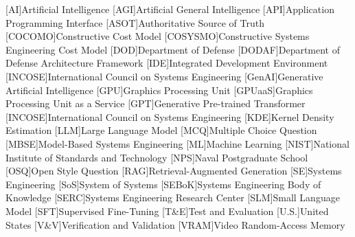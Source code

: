 \begin{acronym} %


[AI]{Artificial Intelligence}
[AGI]{Artificial General Intelligence}
[API]{Application Programming Interface}
[ASOT]{Authoritative Source of Truth}
[COCOMO]{Constructive Cost Model}
[COSYSMO]{Constructive Systems Engineering Cost Model}
[DOD]{Department of Defense}
[DODAF]{Department of Defense Architecture Framework}
[IDE]{Integrated Development Environment}
[INCOSE]{International Council on Systems Engineering}
[GenAI]{Generative Artificial Intelligence}
[GPU]{Graphics Processing Unit}
[GPUaaS]{Graphics Processing Unit as a Service}
[GPT]{Generative Pre-trained Transformer}
[INCOSE]{International Council on Systems Engineering}
[KDE]{Kernel Density Estimation}
[LLM]{Large Language Model}
[MCQ]{Multiple Choice Question}
[MBSE]{Model-Based Systems Engineering}
[ML]{Machine Learning}
[NIST]{National Institute of Standards and Technology}
[NPS]{Naval Postgraduate School}
[OSQ]{Open Style Question}
[RAG]{Retrieval-Augmented Generation}
[SE]{Systems Engineering}
[SoS]{System of Systems}
[SEBoK]{Systems Engineering Body of Knowledge}
[SERC]{Systems Engineering Research Center}
[SLM]{Small Language Model}
[SFT]{Supervised Fine-Tuning}
[T\&E]{Test and Evaluation}
[U.S.]{United States}
[V\&V]{Verification and Validation}
[VRAM]{Video Random-Access Memory}



\end{acronym}

